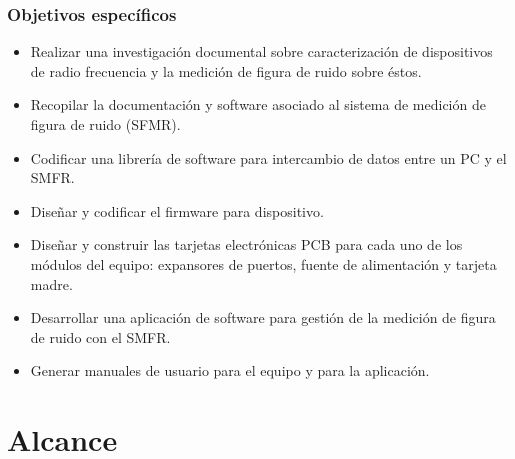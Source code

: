 \documentclass[xcolor=pdftext, table]{beamer}
\begin{document}
	
	\begin{frame}
		\frametitle{Objetivos específicos}		

		\begin{small}
			\begin{block}{}		
				\begin{itemize}
					\item Realizar una investigación documental sobre caracterización de dispositivos de radio frecuencia y la medición de figura de ruido sobre éstos.	
											
					\item Recopilar la documentación y software asociado al sistema de medición de figura de ruido (SFMR).	
					
					\item Codificar una librería de software para intercambio de datos entre un PC y el SMFR.
					
					\item Diseñar y codificar el firmware para dispositivo.
					
					\item Diseñar y construir las tarjetas electrónicas PCB para cada uno de los módulos del equipo: expansores de puertos, fuente de alimentación y tarjeta madre. 
					
					\item Desarrollar una aplicación de software para gestión de la medición de figura de ruido con el SMFR.
					
					\item Generar manuales de usuario para el equipo y para la aplicación.	
				\end{itemize}				
			\end{block}
		\end{small}
		
	\end{frame}
	
	
	\section{Alcance}
	
\end{document}
